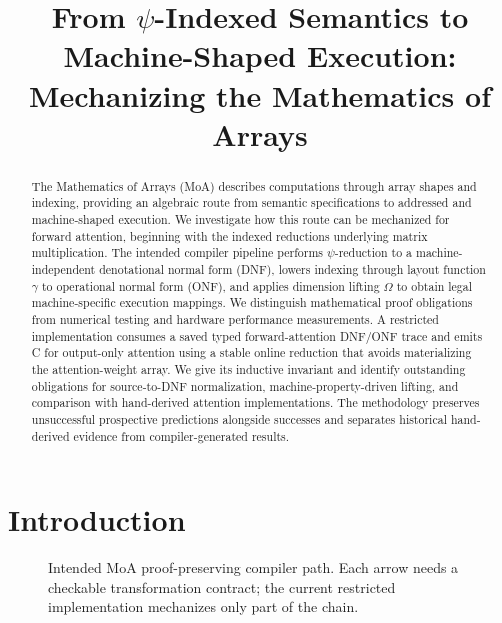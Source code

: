 \documentclass[sigplan,10pt,review,anonymous]{acmart}
\begin{document}
\title{From $\psi$-Indexed Semantics to Machine-Shaped Execution: Mechanizing the Mathematics of Arrays}
\begin{abstract}
The Mathematics of Arrays (MoA) describes computations through array shapes and indexing, providing an algebraic route from semantic specifications to addressed and machine-shaped execution. We investigate how this route can be mechanized for forward attention, beginning with the indexed reductions underlying matrix multiplication. The intended compiler pipeline performs $\psi$-reduction to a machine-independent denotational normal form (DNF), lowers indexing through layout function $\gamma$ to operational normal form (ONF), and applies dimension lifting $\Omega$ to obtain legal machine-specific execution mappings. We distinguish mathematical proof obligations from numerical testing and hardware performance measurements. A restricted implementation consumes a saved typed forward-attention DNF/ONF trace and emits C for output-only attention using a stable online reduction that avoids materializing the attention-weight array. We give its inductive invariant and identify outstanding obligations for source-to-DNF normalization, machine-property-driven lifting, and comparison with hand-derived attention implementations. The methodology preserves unsuccessful prospective predictions alongside successes and separates historical hand-derived evidence from compiler-generated results.
\end{abstract}
\maketitle
\section{Introduction}
\begin{figure}[t]
\centering
{}
\caption{Intended MoA proof-preserving compiler path. Each arrow needs a checkable transformation contract; the current restricted implementation mechanizes only part of the chain.}
\label{fig:moa-path}
\end{figure}
\end{document}
